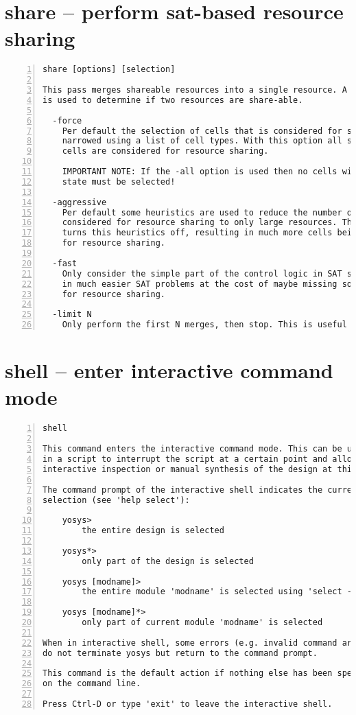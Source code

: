 \section{share -- perform sat-based resource sharing}
\label{cmd:share}
\begin{lstlisting}[numbers=left,frame=single]
    share [options] [selection]

This pass merges shareable resources into a single resource. A SAT solver
is used to determine if two resources are share-able.

  -force
    Per default the selection of cells that is considered for sharing is
    narrowed using a list of cell types. With this option all selected
    cells are considered for resource sharing.

    IMPORTANT NOTE: If the -all option is used then no cells with internal
    state must be selected!

  -aggressive
    Per default some heuristics are used to reduce the number of cells
    considered for resource sharing to only large resources. This options
    turns this heuristics off, resulting in much more cells being considered
    for resource sharing.

  -fast
    Only consider the simple part of the control logic in SAT solving, resulting
    in much easier SAT problems at the cost of maybe missing some opportunities
    for resource sharing.

  -limit N
    Only perform the first N merges, then stop. This is useful for debugging.
\end{lstlisting}

\section{shell -- enter interactive command mode}
\label{cmd:shell}
\begin{lstlisting}[numbers=left,frame=single]
    shell

This command enters the interactive command mode. This can be useful
in a script to interrupt the script at a certain point and allow for
interactive inspection or manual synthesis of the design at this point.

The command prompt of the interactive shell indicates the current
selection (see 'help select'):

    yosys>
        the entire design is selected

    yosys*>
        only part of the design is selected

    yosys [modname]>
        the entire module 'modname' is selected using 'select -module modname'

    yosys [modname]*>
        only part of current module 'modname' is selected

When in interactive shell, some errors (e.g. invalid command arguments)
do not terminate yosys but return to the command prompt.

This command is the default action if nothing else has been specified
on the command line.

Press Ctrl-D or type 'exit' to leave the interactive shell.
\end{lstlisting}

